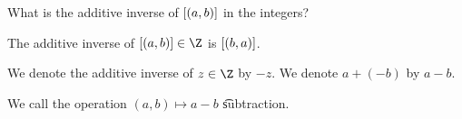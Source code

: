 

What is the additive inverse of $[(a, b)]$ in the integers?


\begin{proposition}
  The additive inverse of $\eqc{(a, b)} \in \Z$ is $[(b, a)]$.
\end{proposition}


We denote the additive inverse of $z \in \Z$ by $-z$.
We denote $a + (- b)$ by $a - b$.


We call the operation $(a, b) \mapsto a - b$ \t{subtraction}.

\blankpage
